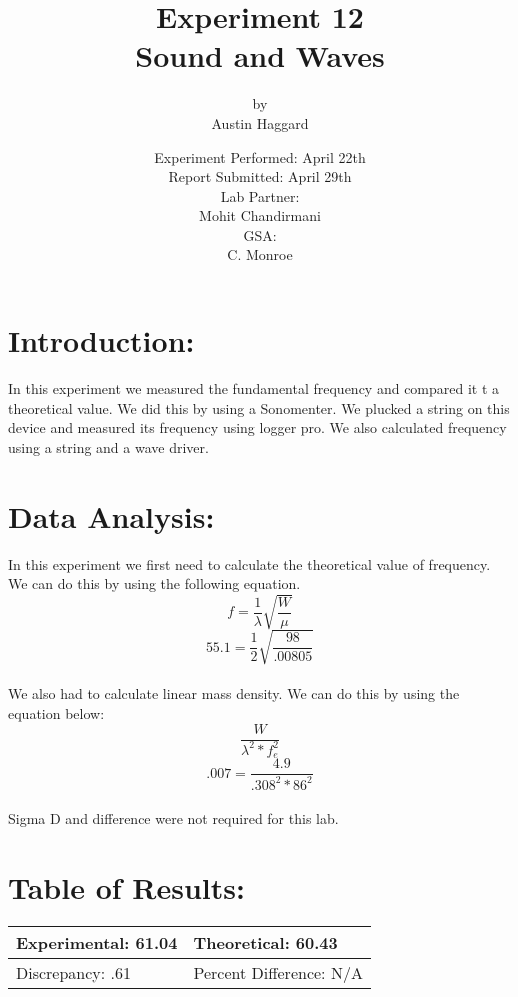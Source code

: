 \documentclass{article}
\title{Experiment 12 \\ Sound and Waves}
\author{by \\ Austin Haggard}
\date{
	Experiment Performed: April 22th \\
	Report Submitted: April 29th \\[11pt]
	Lab Partner: \\ Mohit Chandirmani \\[11pt] 
	GSA: \\ C. Monroe
}
\begin{document}
\maketitle
\thispagestyle{empty}
\newpage

\section*{Introduction:}
\setcounter{page}{1}
In this experiment we measured the fundamental frequency and compared it t a theoretical value.  We did this by using a Sonomenter.  We plucked a string on this device and measured its frequency using logger pro. We also calculated frequency using a string and a wave driver.
\newpage


\section*{Data Analysis:}
\setcounter{page}{3}
In this experiment we first need to calculate the theoretical value of frequency.  We can do this by using the following equation.
\[f = \frac{1}{\lambda}\sqrt{\frac{W}{\mu}}\]
\[55.1 = \frac{1}{2}\sqrt{\frac{98}{.00805}}\]
\\
We also had to calculate linear mass density.  We can do this by using the equation below:
\[\frac{W}{\lambda^2* f_e^2}\]
\[.007 = \frac{4.9}{.308^2*86^2}\]
\\
Sigma D and difference were not required for this lab.
\newpage

\section*{Table of Results:}
\begin{center}
\begin{tabular}{|l|l|}
\hline
	Experimental: 61.04 & Theoretical: 60.43  \\ \hline
	Discrepancy: .61  & Percent Difference: N/A \\
\hline
\end{tabular}
\end{center}
\end{document}
